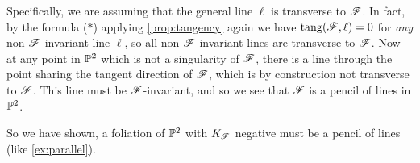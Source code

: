 Specifically, we are assuming that the general line $\ell$ is transverse to
$\scrF$. In fact, by the formula ($*$) applying \cref{prop:tangency} again we
have $\tang(\scrF,\ell)=0$ for \emph{any} non-$\scrF$-invariant line $\ell$, so
all non-$\scrF$-invariant lines are transverse to $\scrF$. Now at any point in
$\P^2$ which is not a singularity of $\scrF$, there is a line through the point
sharing the tangent direction of $\scrF$, which is by construction not
transverse to $\scrF$. This line must be $\scrF$-invariant, and so we see that
$\scrF$ is a pencil of lines in $\P^2$.

So we have shown, a foliation of $\P^2$ with $K_\scrF$ negative must be a pencil
of lines (like \cref{ex:parallel}).
